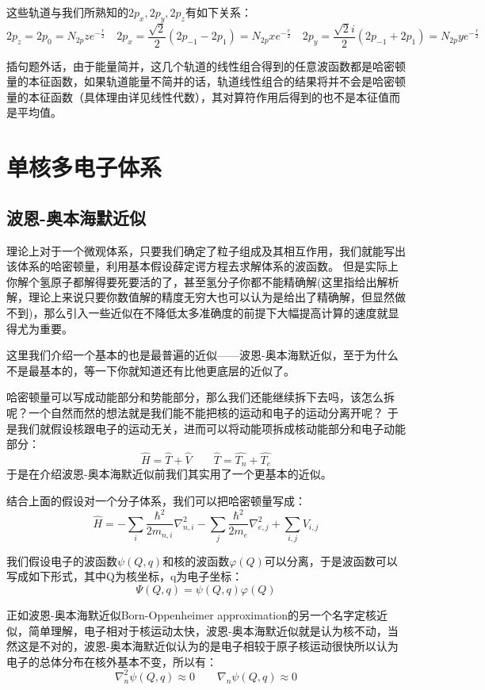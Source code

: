 这些轨道与我们所熟知的$2p_x,2p_y,2p_z$有如下关系：
\[2p_z=2p_0=N_{2p}ze^{-\frac{r}{2}} \quad 2p_x=\frac{\sqrt{2}}{2}(2p_{-1}-2p_1)=N_{2p}xe^{-\frac{r}{2}} \quad 2p_y=\frac{\sqrt{2}i}{2}(2p_{-1}+2p_1)=N_{2p}ye^{-\frac{r}{2}}\]

插句题外话，由于能量简并，这几个轨道的线性组合得到的任意波函数都是哈密顿量的本征函数，如果轨道能量不简并的话，轨道线性组合的结果将并不会是哈密顿量的本征函数（具体理由详见线性代数），其对算符作用后得到的也不是本征值而是平均值。

\section{单核多电子体系}
\subsection{波恩-奥本海默近似}
理论上对于一个微观体系，只要我们确定了粒子组成及其相互作用，我们就能写出该体系的哈密顿量，利用基本假设薛定谔方程去求解体系的波函数。
但是实际上你解个氢原子都解得要死要活的了，甚至氢分子你都不能精确解(这里指给出解析解，理论上来说只要你数值解的精度无穷大也可以认为是给出了精确解，但显然做不到)，那么引入一些近似在不降低太多准确度的前提下大幅提高计算的速度就显得尤为重要。

这里我们介绍一个基本的也是最普遍的近似——波恩-奥本海默近似，至于为什么不是最基本的，等一下你就知道还有比他更底层的近似了。

哈密顿量可以写成动能部分和势能部分，那么我们还能继续拆下去吗，该怎么拆呢？一个自然而然的想法就是我们能不能把核的运动和电子的运动分离开呢？
于是我们就假设核跟电子的运动无关，进而可以将动能项拆成核动能部分和电子动能部分：
\[\hat{H}=\hat{T}+\hat{V} \qquad \hat{T}=\hat{T_n}+\hat{T_e}\]
于是在介绍波恩-奥本海默近似前我们其实用了一个更基本的近似。

结合上面的假设对一个分子体系，我们可以把哈密顿量写成：
\[\hat{H}=-\sum_i\frac{\hbar^2}{2m_{n,i}}\nabla^2_{n,i}-\sum_j\frac{\hbar^2}{2m_e}\nabla^2_{e,j}+\sum_{i,j}V_{i,j}\]

我们假设电子的波函数$\psi(Q,q)$和核的波函数$\varphi(Q)$可以分离，于是波函数可以写成如下形式，其中Q为核坐标，q为电子坐标：
\[\varPsi(Q,q)=\psi(Q,q)\varphi(Q)\]

正如波恩-奥本海默近似Born-Oppenheimer approximation的另一个名字定核近似，简单理解，电子相对于核运动太快，波恩-奥本海默近似就是认为核不动，当然这是不对的，波恩-奥本海默近似认为的是电子相较于原子核运动很快所以认为电子的总体分布在核外基本不变，所以有：
\[\nabla^2_n\psi(Q,q) \approx 0 \qquad \nabla_n\psi(Q,q) \approx 0\]

